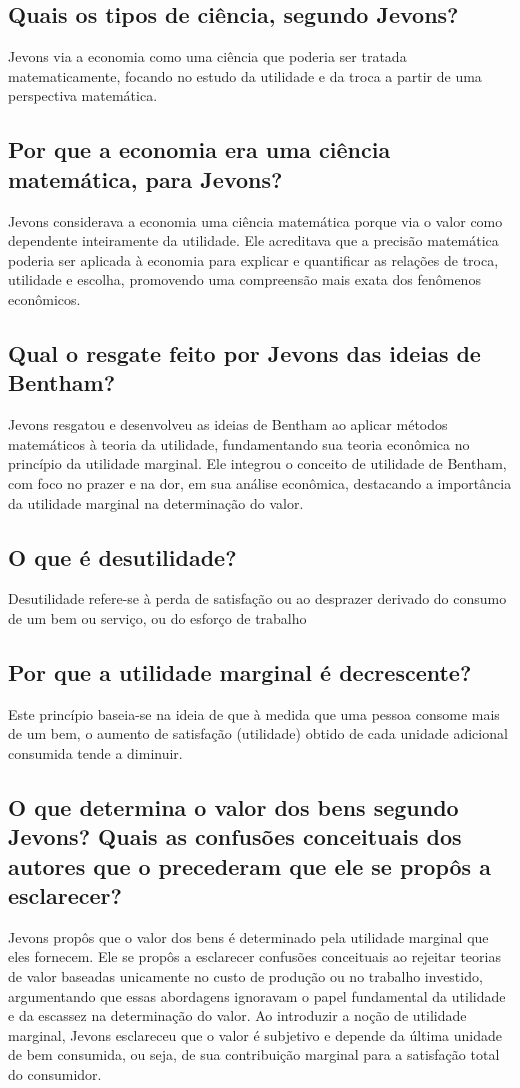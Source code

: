 \documentclass[12pt]{article}
\begin{document}
\subsection{\textbf{Quais os tipos de ciência, segundo Jevons?}}
 Jevons via a economia como uma ciência que poderia ser tratada matematicamente, focando no estudo da utilidade e da troca a partir de uma perspectiva matemática.
\subsection{\textbf{Por que a economia era uma ciência matemática, para Jevons?}}
Jevons considerava a economia uma ciência matemática porque via o valor como dependente inteiramente da utilidade. Ele acreditava que a precisão matemática poderia ser aplicada à economia para explicar e quantificar as relações de troca, utilidade e escolha, promovendo uma compreensão mais exata dos fenômenos econômicos.
\subsection{\textbf{Qual o resgate feito por Jevons das ideias de Bentham?}}
Jevons resgatou e desenvolveu as ideias de Bentham ao aplicar métodos matemáticos à teoria da utilidade, fundamentando sua teoria econômica no princípio da utilidade marginal. Ele integrou o conceito de utilidade de Bentham, com foco no prazer e na dor, em sua análise econômica, destacando a importância da utilidade marginal na determinação do valor.
\subsection{\textbf{O que é desutilidade?}}
Desutilidade refere-se à perda de satisfação ou ao desprazer derivado do consumo de um bem ou serviço, ou do esforço de trabalho
\subsection{\textbf{Por que a utilidade marginal é decrescente?}}
 Este princípio baseia-se na ideia de que à medida que uma pessoa consome mais de um bem, o aumento de satisfação (utilidade) obtido de cada unidade adicional consumida tende a diminuir.
\subsection{\textbf{O que determina o valor dos bens segundo Jevons? Quais as confusões conceituais dos autores que o precederam que ele se propôs a esclarecer?}}
Jevons propôs que o valor dos bens é determinado pela utilidade marginal que eles fornecem. Ele se propôs a esclarecer confusões conceituais ao rejeitar teorias de valor baseadas unicamente no custo de produção ou no trabalho investido, argumentando que essas abordagens ignoravam o papel fundamental da utilidade e da escassez na determinação do valor. Ao introduzir a noção de utilidade marginal, Jevons esclareceu que o valor é subjetivo e depende da última unidade de bem consumida, ou seja, de sua contribuição marginal para a satisfação total do consumidor.
\end{document}
